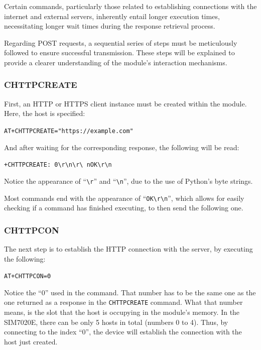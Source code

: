 Certain commands, particularly those related to establishing connections with the internet and 
external servers, inherently entail longer execution times, necessitating longer wait times during 
the response retrieval process.

Regarding POST requests, a sequential series of steps must be meticulously followed to ensure 
successful transmission. These steps will be explained to provide a clearer understanding of the 
module's interaction mechanisms.

\subsubsection*{CHTTPCREATE}
First, an HTTP or HTTPS client instance must be created within the module. Here, the host is 
specified:
\begin{center}
	\texttt{AT+CHTTPCREATE="https://example.com"}
\end{center}
And after waiting for the corresponding response, the following will be read:
\begin{center}
	\texttt{+CHTTPCREATE: 0\textbackslash r\textbackslash n\textbackslash r\textbackslash
	nOK\textbackslash r\textbackslash n}
\end{center}

Notice the appearance of ``\texttt{\textbackslash r}'' and ``\texttt{\textbackslash n}'', due to 
the use of Python's byte strings.

Most commands end with the appearance of ``\texttt{OK\textbackslash r\textbackslash n}'', which 
allows for easily checking if a command has finished executing, to then send the following one.

\subsubsection*{CHTTPCON}
The next step is to establish the HTTP connection with the server, by executing the following:
\begin{center}
	\texttt{AT+CHTTPCON=0}
\end{center}

Notice the ``0'' used in the command. That number has to be the same one as the one returned as a 
response in the \texttt{CHTTPCREATE} command. What that number means, is the slot that the host is 
occupying in the module's memory. In the SIM7020E, there can be only 5 hosts in total (numbers 0 
to 4). Thus, by connecting to the index ``0'', the device will establish the connection with the 
host just created.


